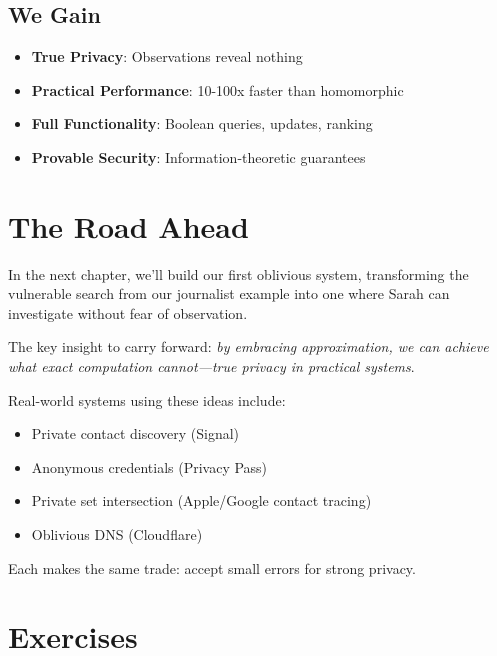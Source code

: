 \subsection{We Gain}
\begin{itemize}
\item \textbf{True Privacy}: Observations reveal nothing
\item \textbf{Practical Performance}: 10-100x faster than homomorphic
\item \textbf{Full Functionality}: Boolean queries, updates, ranking
\item \textbf{Provable Security}: Information-theoretic guarantees
\end{itemize}

\section{The Road Ahead}

In the next chapter, we'll build our first oblivious system, transforming the vulnerable search from our journalist example into one where Sarah can investigate without fear of observation.

The key insight to carry forward: \textit{by embracing approximation, we can achieve what exact computation cannot---true privacy in practical systems}.

\begin{inpractice}
Real-world systems using these ideas include:
\begin{itemize}
\item Private contact discovery (Signal)
\item Anonymous credentials (Privacy Pass)
\item Private set intersection (Apple/Google contact tracing)
\item Oblivious DNS (Cloudflare)
\end{itemize}

Each makes the same trade: accept small errors for strong privacy.
\end{inpractice}

\section{Exercises}

